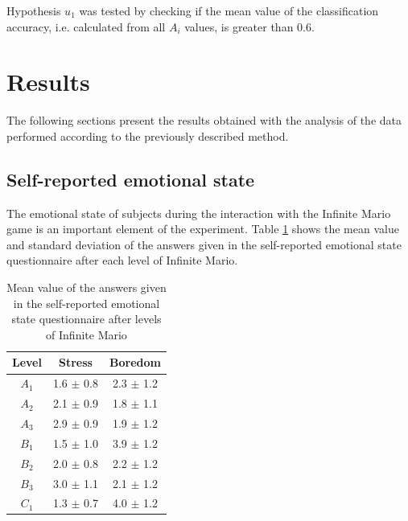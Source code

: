 Hypothesis $u_1$ was tested by checking if the mean value of the classification accuracy, i.e. calculated from all $A_i$ values, is greater than 0.6.


\section{Results}
\label{s:experiment2-results}

The following sections present the results obtained with the analysis of the data performed according to the previously described method.

\subsection{Self-reported emotional state}

The emotional state of subjects during the interaction with the Infinite Mario game is an important element of the experiment. Table \ref{table:experiment2-mario-emotions} shows the mean value and standard deviation of the answers given in the self-reported emotional state questionnaire after each level of Infinite Mario.

\begin{table}[!htbp]
  \centering
  \caption{Mean value of the answers given in the self-reported emotional state questionnaire after levels of Infinite Mario}
  \label{table:experiment2-mario-emotions}
  \begin{tabular}{ccc}
    \toprule%
      \textbf{Level} & \textbf{Stress} & \textbf{Boredom} \\
    \midrule%
      $A_1$ & 1.6 $\pm$ 0.8 & 2.3 $\pm$ 1.2 \\
      $A_2$ & 2.1 $\pm$ 0.9 & 1.8 $\pm$ 1.1 \\
      $A_3$ & 2.9 $\pm$ 0.9 & 1.9 $\pm$ 1.2 \\
      $B_1$ & 1.5 $\pm$ 1.0 & 3.9 $\pm$ 1.2 \\
      $B_2$ & 2.0 $\pm$ 0.8 & 2.2 $\pm$ 1.2 \\
      $B_3$ & 3.0 $\pm$ 1.1 & 2.1 $\pm$ 1.2 \\
      $C_1$ & 1.3 $\pm$ 0.7 & 4.0 $\pm$ 1.2 \\
    \bottomrule%
  \end{tabular}
\end{table}

